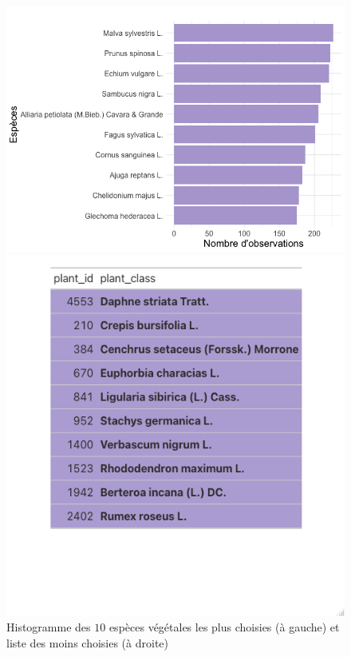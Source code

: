 \documentclass[a4paper,12pt]{article}
\begin{document}
\begin{figure}[H]
\centering
\begin{minipage}{0.55\textwidth}
  \includegraphics[width=\linewidth]{images/10_Most_Observed_Species_Users.png}
\end{minipage}%
\hfill
\begin{minipage}{0.4\textwidth}
  \includegraphics[width=\linewidth]{images/10_Least_Observed_Species_Users.png}
\end{minipage}
\caption{Histogramme des $10$ espèces végétales les plus choisies (à gauche) et liste des moins choisies (à droite)}
\end{figure}
\end{document}
